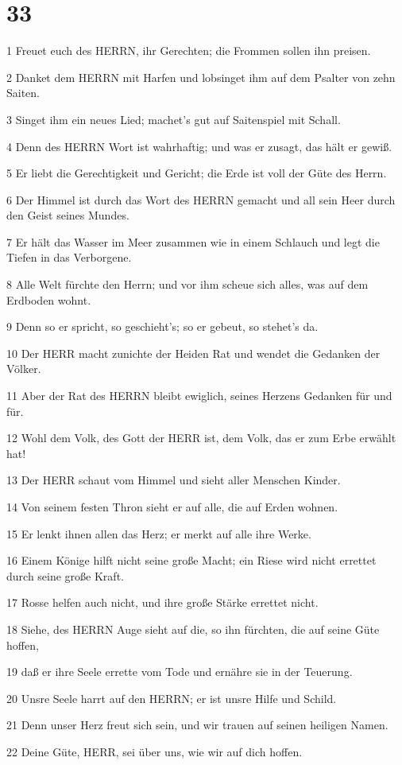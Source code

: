 \chapter{33}

\par 1 Freuet euch des HERRN, ihr Gerechten; die Frommen sollen ihn preisen.
\par 2 Danket dem HERRN mit Harfen und lobsinget ihm auf dem Psalter von zehn Saiten.
\par 3 Singet ihm ein neues Lied; machet's gut auf Saitenspiel mit Schall.
\par 4 Denn des HERRN Wort ist wahrhaftig; und was er zusagt, das hält er gewiß.
\par 5 Er liebt die Gerechtigkeit und Gericht; die Erde ist voll der Güte des Herrn.
\par 6 Der Himmel ist durch das Wort des HERRN gemacht und all sein Heer durch den Geist seines Mundes.
\par 7 Er hält das Wasser im Meer zusammen wie in einem Schlauch und legt die Tiefen in das Verborgene.
\par 8 Alle Welt fürchte den Herrn; und vor ihm scheue sich alles, was auf dem Erdboden wohnt.
\par 9 Denn so er spricht, so geschieht's; so er gebeut, so stehet's da.
\par 10 Der HERR macht zunichte der Heiden Rat und wendet die Gedanken der Völker.
\par 11 Aber der Rat des HERRN bleibt ewiglich, seines Herzens Gedanken für und für.
\par 12 Wohl dem Volk, des Gott der HERR ist, dem Volk, das er zum Erbe erwählt hat!
\par 13 Der HERR schaut vom Himmel und sieht aller Menschen Kinder.
\par 14 Von seinem festen Thron sieht er auf alle, die auf Erden wohnen.
\par 15 Er lenkt ihnen allen das Herz; er merkt auf alle ihre Werke.
\par 16 Einem Könige hilft nicht seine große Macht; ein Riese wird nicht errettet durch seine große Kraft.
\par 17 Rosse helfen auch nicht, und ihre große Stärke errettet nicht.
\par 18 Siehe, des HERRN Auge sieht auf die, so ihn fürchten, die auf seine Güte hoffen,
\par 19 daß er ihre Seele errette vom Tode und ernähre sie in der Teuerung.
\par 20 Unsre Seele harrt auf den HERRN; er ist unsre Hilfe und Schild.
\par 21 Denn unser Herz freut sich sein, und wir trauen auf seinen heiligen Namen.
\par 22 Deine Güte, HERR, sei über uns, wie wir auf dich hoffen.

